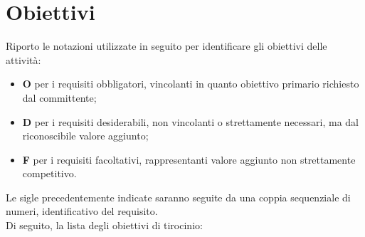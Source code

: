 \section{Obiettivi}
\label{sec:obiettivi-aziendali}
Riporto le notazioni utilizzate in seguito per identificare gli obiettivi delle attività:
\begin{itemize}
    \item \textbf{O} per i requisiti obbligatori, vincolanti in quanto obiettivo primario richiesto dal committente;
    \item \textbf{D} per i requisiti desiderabili, non vincolanti o strettamente necessari, ma dal riconoscibile valore aggiunto;
    \item \textbf{F} per i requisiti facoltativi, rappresentanti valore aggiunto non strettamente competitivo.
\end{itemize}
Le sigle precedentemente indicate saranno seguite da una coppia sequenziale di numeri, identificativo del requisito. \\
Di seguito, la lista degli obiettivi di tirocinio:
